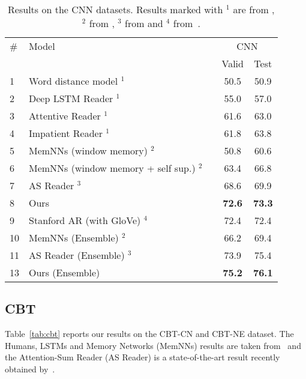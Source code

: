 \documentclass[11pt]{article}
\begin{document}
\begin{table*}[t]
\small
\def\arraystretch{1.1}
\centering
\begin{tabular}{llccc}
\toprule
\# & Model & \phantom{abcd} & \multicolumn{2}{c}{CNN} \\
&& & Valid & Test \\
\midrule
\small{1}&Word distance model $^{1}$ && 50.5 & 50.9 \\
\small{2}&Deep LSTM Reader $^{1}$  && 55.0 & 57.0 \\
\small{3}&Attentive Reader $^{1}$  && 61.6 & 63.0 \\
\small{4}&Impatient Reader $^{1}$                              && 61.8 & 63.8 \\
\midrule
\small{5}&MemNNs (window memory) $^{2}$                        && 50.8 & 60.6 \\
\small{6}&MemNNs (window memory + self sup.) $^{2}$            && 63.4 & 66.8 \\
\small{7}&AS Reader $^{3}$                                     && 68.6 & 69.9 \\
\small{8}&Ours                                                 && \textbf{72.6} & \textbf{73.3} \\
\midrule
\small{9}&Stanford AR (with GloVe) $^{4}$                      && 72.4 & 72.4 \\
\midrule
\midrule
\small{10}&MemNNs (Ensemble) $^{2}$                            && 66.2 & 69.4 \\
\small{11}&AS Reader (Ensemble) $^3$                           && 73.9 & 75.4 \\
\small{13}&Ours (Ensemble)                                     && \textbf{75.2} & \textbf{76.1} \\
\bottomrule
\end{tabular}
\caption{\label{tab:cnn}Results on the CNN datasets. Results marked with $^1$ are from \protect\cite{hermann2015teaching}, $^2$ from \protect\cite{hill2015goldilocks}, $^{3}$ from \protect\cite{watson} and $^4$ from~\protect\cite{danqi}.}
\end{table*}

\subsection{CBT}
Table~\ref{tab:cbt} reports our results on the CBT-CN and CBT-NE dataset. The Humans, LSTMs and Memory Networks (MemNNs) results are taken from~\cite{hill2015goldilocks} and the Attention-Sum Reader (AS Reader) is a state-of-the-art result recently obtained by~\cite{watson}.
\end{document}
